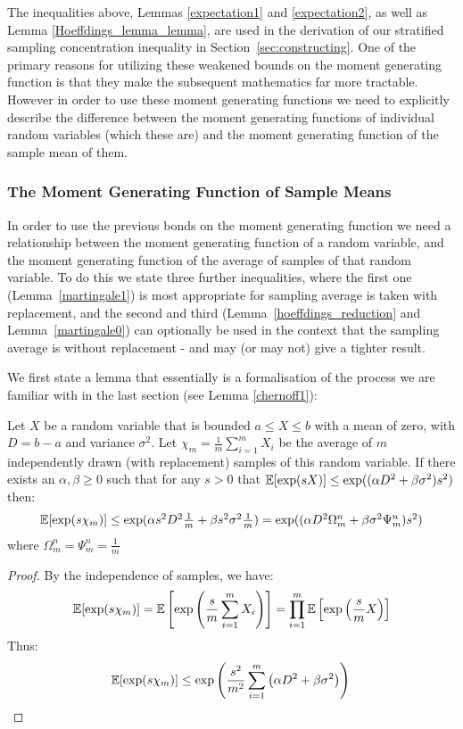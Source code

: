 The inequalities above, Lemmas \ref{expectation1} and \ref{expectation2}, as well as Lemma \ref{Hoeffdings_lemma_lemma}, are used in the derivation of our stratified sampling concentration inequality in Section~\ref{sec:constructing}. One of the primary reasons for utilizing these weakened bounds on the moment generating function is that they make the subsequent mathematics far more tractable.
However in order to use these moment generating functions we need to explicitly describe the difference between the moment generating functions of individual random variables (which these are) and the moment generating function of the sample mean of them.

\subsubsection{The Moment Generating Function of Sample Means}\label{sec:without_replacement}

In order to use the previous bonds on the moment generating function we need a relationship between the moment generating function of a random variable, and the moment generating function of the average of samples of that random variable.
To do this we state three further inequalities, where the first one (Lemma~\ref{martingale1}) is most appropriate for sampling average is taken with replacement, and the second and third (Lemma~\ref{hoeffdings_reduction} and Lemma~\ref{martingale0}) can optionally be used in the context that the sampling average is without replacement - and may (or may not) give a tighter result.

We first state a lemma that essentially is a formalisation of the process we are familiar with in the last section (see Lemma \ref{chernoff1}):

\begin{lemma}\label{martingale1}
Let $X$ be a random variable that is bounded $a\le X\le b$ with a mean of zero, with $D=b-a$ and variance $\sigma^2$.
Let $\chi_m = \frac{1}{m}\sum_{i=1}^mX_i$ be the average of $m$ independently drawn (with replacement) samples of this random variable.
If there exists an $\alpha, \beta \ge 0$ such that for any $s>0$ that $\operatorname{\mathbb{E}}[\exp(sX)]\le\exp((\alpha D^2 +\beta \sigma^2) s^2)$ then:
$$\textstyle\operatorname{\mathbb{E}}[\exp(s\chi_m)]\le\exp(\alpha s^2D^2\frac{1}{m} +\beta s^2\sigma^2 \frac{1}{m}) = \exp((\alpha D^2{\Omega}_m^n +\beta\sigma^2 {\Psi}_m^n)s^2)$$
where ${\Omega}_m^n = {\Psi}_m^n = \frac{1}{m}$
\end{lemma}
\begin{proof} 
By the independence of samples, we have:
\[\operatorname{\mathbb{E}}[\exp(s\chi_m)]=\operatorname{\mathbb{E}}\left[\exp\left(\frac{s}{m}\sum_{i=1}^mX_i\right)\right]=\prod_{i=1}^m\operatorname{\mathbb{E}}\left[\exp\left(\frac{s}{m}X\right)\right]\] 
Thus:
\[\operatorname{\mathbb{E}}[\exp(s\chi_m)] \le \exp\left(\frac{s^2}{m^2}\sum_{i=1}^m\left(\alpha D^2 +\beta \sigma^2\right) \right) \qedhere\]
\end{proof}

